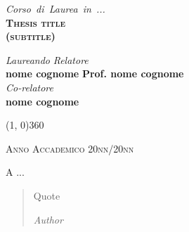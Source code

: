 \documentclass[a4paper, 12pt, twoside, openright]{book}
\begin{document}
\begin{titlepage}
\begin{center}
\vspace{1cm}
\emph{\Large{Corso~di~Laurea~in~...}} \\
\vspace{1.5cm}
\scshape{\Large{\bfseries{Thesis title}}} \\
\vspace{0.2cm} \linespread{1} \scshape{\large{\bfseries{(subtitle)}}}
\end{center}

\vfill
\begin{normalsize}
\begin{flushleft}
  \hspace{45pt} \textit{Laureando} \hspace{160pt} \textit{Relatore}\\
  \vspace{5pt}
  \hspace{30pt} \large{\textbf{nome cognome}} \hspace{70pt} \large{\textbf{Prof. nome cognome}}\\
  \vspace{10pt}
  \hspace{260pt} \normalsize{\textit{Co-relatore}}\\
  \vspace{5pt}
  \hspace{240pt} \large{\textbf{nome cognome}}
\end{flushleft}
\end{normalsize}

\vfill
\begin{center}
\hspace{-0.2cm}
\line(1, 0){360}

\textsc{Anno Accademico 20nn/20nn}
\end{center}
\end{titlepage}


\cleardoublepage %
\thispagestyle{empty} %

\null
\vspace{2cm}
\begin{flushright}
A ...
\end{flushright}
\vfill

\begin{quote}
  Quote

  \textit{Author}
\end{quote}
\vfill
\null


\begingroup %
  \makeatletter
  \let\ps@plain\ps@empty
  \makeatother
  \tableofcontents
  \clearpage
\endgroup
\end{document}

